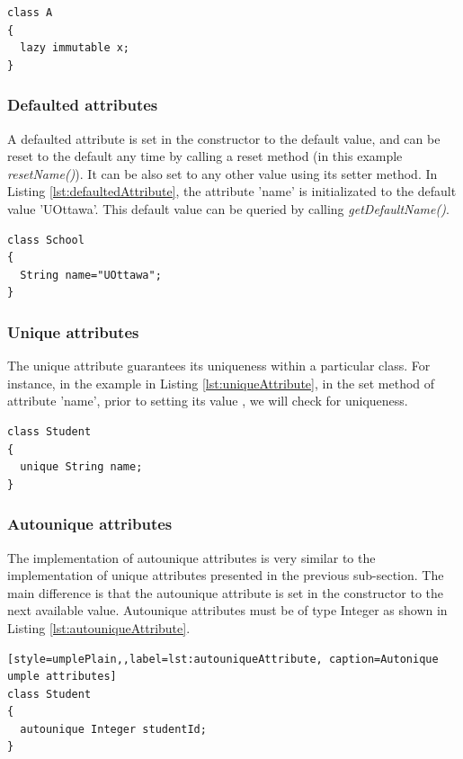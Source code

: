 \begin{lstlisting}[style=umplePlain,label=lst:lazyimmutableAttribute, caption=Lazy immutable Umple attribute]
class A 
{
  lazy immutable x;
}
\end{lstlisting}


\subsubsection{Defaulted attributes}
A defaulted attribute is set in the constructor to the default value, and can be reset to the default any time by calling a reset method (in this example \textit{resetName()}). It can be also set to any other value using its setter method. In Listing \ref{lst:defaultedAttribute}, the attribute 'name' is initializated to the default value 'UOttawa'. This default value can be queried by calling \textit{getDefaultName()}.

\begin{lstlisting}[style=umplePlain,label=lst:defaultedAttribute, caption=Defaulted Umple attribute]
class School 
{
  String name="UOttawa";
}
\end{lstlisting}

\subsubsection{Unique attributes}
The unique attribute guarantees its uniqueness within a particular class.
For instance, in the example in Listing \ref{lst:uniqueAttribute}, in the set method of attribute 'name', prior to setting its value , we will check for uniqueness. 

\begin{lstlisting}[style=umplePlain,label=lst:uniqueAttribute, caption=Unique Umple attribute]
class Student 
{
  unique String name;
}
\end{lstlisting}

\subsubsection{Autounique attributes}
The implementation of autounique attributes is very similar to the implementation of unique attributes presented in the previous sub-section. The main difference is that the autounique attribute is set in the constructor to the next available value. Autounique attributes must be of type Integer as shown in Listing \ref{lst:autouniqueAttribute}.

\begin{lstlisting}[style=umplePlain,,label=lst:autouniqueAttribute, caption=Autonique umple attributes]
class Student 
{
  autounique Integer studentId;
}
\end{lstlisting}

